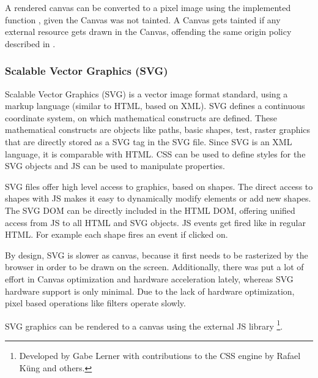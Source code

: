 A rendered canvas can be converted to a pixel image using the implemented function , given the Canvas was not tainted.
A Canvas gets tainted if any external resource gets drawn in the Canvas, offending the same origin policy described in .

\subsubsection{Scalable Vector Graphics (SVG)}
\label{sec:svg}

Scalable Vector Graphics (SVG) is a vector image format standard, using a markup language (similar to HTML, based on XML).
SVG defines a continuous coordinate system, on which mathematical constructs are defined.
These mathematical constructs are objects like paths, basic shapes, test, raster graphics that are directly stored as a SVG tag in the SVG file.
Since SVG is an XML language, it is comparable with HTML.
CSS can be used to define styles for the SVG objects and JS can be used to manipulate properties.

SVG files offer high level access to graphics, based on shapes.
The direct access to shapes with JS makes it easy to dynamically modify elements or add new shapes.
The SVG DOM can be directly included in the HTML DOM, offering unified access from JS to all HTML and SVG objects.
JS events get fired like in regular HTML.
For example each shape fires an  event if clicked on.


By design, SVG is slower as canvas, because it first needs to be rasterized by the browser in order to be drawn on the screen.
Additionally, there was put a lot of effort in Canvas optimization and hardware acceleration lately, whereas SVG hardware support is only minimal.
Due to the lack of hardware optimization, pixel based operations like filters operate slowly.

SVG graphics can be rendered to a canvas using the external JS library \footnote{Developed by Gabe Lerner with contributions to the CSS engine by Rafael K\"ung and others.}.




